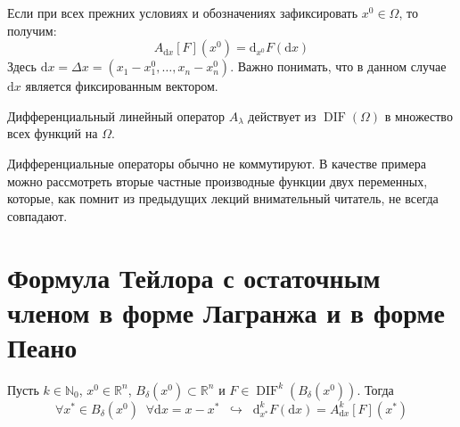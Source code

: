 \documentclass[11pt]{article}
\DeclareMathOperator{\DIF}{DIF}
\begin{document}
\begin{remark}
    Если при всех прежних условиях и обозначениях зафиксировать $x^0 \in \Omega$, то получим:
    \[A_{\mathrm{d} x}[F]\left(x^0\right) = \mathrm{d}_{x^0}F(\mathrm{d} x)\]
    Здесь $\mathrm{d} x = \Delta x = \left(x_1 - x_1^0, \ldots, x_n - x_n^0\right)$. Важно понимать, что в данном случае $\mathrm{d} x$ является фиксированным вектором.
\end{remark}

\begin{remark}
    Дифференциальный линейный оператор $A_{\lambda}$ действует из $\DIF \left(\Omega\right)$ в множество всех функций на $\Omega$.
\end{remark}

\begin{remark}
    Дифференциальные операторы обычно не коммутируют. В качестве примера можно рассмотреть вторые частные производные функции двух переменных, которые, 
    как помнит из предыдущих лекций внимательный читатель, не всегда совпадают.
\end{remark}

\section{Формула Тейлора с остаточным членом в форме Лагранжа и в форме Пеано}

\begin{lemma}
    Пусть $k \in \mathbb{N}_0$, $x^0 \in \mathbb{R}^n$, $B_{\delta} \left(x^0\right) \subset \mathbb{R}^n$ и $F \in \DIF^k \left(B_{\delta} \left(x^0\right) \right)$. Тогда
    \[\forall x^{\ast} \in B_{\delta} \left(x^0\right) \; \; \forall \mathrm{d}x = x - x^{\ast} \; \; \hookrightarrow \; \; \mathrm{d}_{x^{\ast}}^k F \left(\mathrm{d} x\right) = A_{\mathrm{d} x}^k [F] \left(x^{\ast}\right)\]
\end{lemma}
\end{document}
